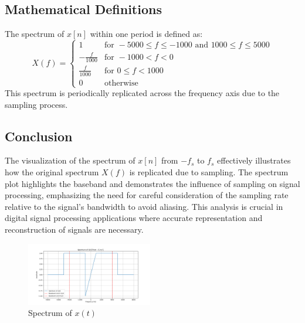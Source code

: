 \subsection{Mathematical Definitions}
The spectrum of $x[n]$ within one period is defined as:
$$
X(f) =
\begin{cases}
1 & \text{for } -5000 \leq f \leq -1000 \text{ and } 1000 \leq f \leq 5000 \\
-\frac{f}{1000} & \text{for } -1000 < f < 0 \\
\frac{f}{1000} & \text{for } 0 \leq f < 1000 \\
0 & \text{otherwise}
\end{cases}
$$
This spectrum is periodically replicated across the frequency axis due to the sampling process.

\subsection{Conclusion}
The visualization of the spectrum of $x[n]$ from $-f_s$ to $f_s$ effectively illustrates how the original spectrum $X(f)$ is replicated due to sampling. The spectrum plot highlights the baseband and demonstrates the influence of sampling on signal processing, emphasizing the need for careful consideration of the sampling rate relative to the signal’s bandwidth to avoid aliasing. This analysis is crucial in digital signal processing applications where accurate representation and reconstruction of signals are necessary.

\begin{figure}[h]
    \centering
    \includegraphics[width=0.49\textwidth]{fig/ex2_b_plot}
    \caption{Spectrum of \(x(t)\)}
    \label{fig:ex2_b_plot}
\end{figure}
